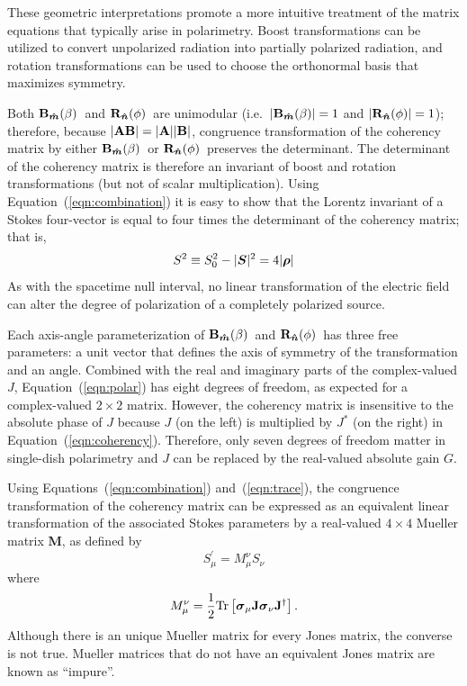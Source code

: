 \documentclass[twocolumn]{aastex6}
\newcommand{\mbf}[1]{\mbox{\boldmath $#1$}}
\newcommand{\mbfs}[1]{\mbox{\scriptsize\boldmath $#1$}}
\newcommand{\Eqn}[1]{Equation~(\ref{eqn:#1})}
\newcommand{\Eqns}[3]{Equations~(\ref{eqn:#1}) #2~(\ref{eqn:#3})}
\newcommand{\irow}{\mu} \newcommand{\icol}{\nu}
\newcommand{\trace}{{\rm Tr}}
\newcommand{\Rotation}{{\bf R}}
\newcommand{\Boost}{{\bf B}}
\newcommand{\vRotation}[1][n]{\ensuremath{\Rotation_{\mbfs{\hat #1}}}}
\newcommand{\vBoost}[1][m]{\ensuremath{\Boost_{\mbfs{\hat #1}}}}
\newcommand{\tr}[1]{\trace\ensuremath{ \left[ {#1} \right] }}
\newcommand{\rotat}{\ensuremath{\vRotation(\phi)}}
\newcommand{\boost}{\ensuremath{\vBoost(\beta)}}
\newcommand{\pauli}[1]{\ensuremath{\mbf{\sigma}_{#1}}}
\newcommand{\inv}[1]{\ensuremath{ {#1}^2 }}
\begin{document}
These geometric interpretations promote a more intuitive treatment of
the matrix equations that typically arise in polarimetry.
%
Boost transformations can be utilized to convert unpolarized radiation
into partially polarized radiation, and rotation transformations can
be used to choose the orthonormal basis that maximizes symmetry.

Both \boost\ and \rotat\ are unimodular (i.e.\ $|\boost|=1$ and
$|\rotat|=1$); therefore, because $|{\bf AB}|=|{\bf A}||{\bf B}|$,
congruence transformation of the coherency matrix by either \boost\ or
\rotat\ preserves the determinant.  The determinant of the coherency
matrix is therefore an invariant of boost and rotation transformations
(but not of scalar multiplication).  Using \Eqn{combination} it is
easy to show that the Lorentz invariant of a Stokes four-vector is
equal to four times the determinant of the coherency matrix; that is,
\begin{equation}
\inv{S} \equiv S_0^2 - |\mbf{S}|^2 = 4 |\mbf{\rho}|
\end{equation}
As with the spacetime null interval, no linear transformation of the
electric field can alter the degree of polarization of a completely
polarized source.

Each axis-angle parameterization of \boost\ and \rotat\ has three free
parameters: a unit vector that defines the axis of symmetry of the
transformation and an angle.  Combined with the real and imaginary
parts of the complex-valued $J$, \Eqn{polar} has eight degrees of
freedom, as expected for a complex-valued $2\times2$ matrix.  However,
the coherency matrix is insensitive to the absolute phase of $J$
because $J$ (on the left) is multiplied by $J^*$ (on the right) in
\Eqn{coherency}.  Therefore, only seven degrees of freedom matter
in single-dish polarimetry and $J$ can be replaced by the real-valued
absolute gain $G$.

Using \Eqns{combination}{and}{trace}, the congruence
transformation of the coherency matrix can be expressed as an
equivalent linear transformation of the associated Stokes parameters
by a real-valued $4\times4$ Mueller matrix {\bf M}, as defined by
%
\begin{equation}
 S_\irow^\prime = M_\irow^\icol S_\icol
\label{eqn:linear_to_Mueller}
\end{equation}
%
where
\begin{equation}
 M_\irow^\icol = \frac{1}{2} \tr{\pauli{\irow}{\bf J}\pauli{\icol}{\bf J}^\dagger}.
\end{equation}
%
Although there is an unique Mueller matrix for every Jones matrix, the
converse is not true.  Mueller matrices that do not have an equivalent Jones
matrix are known as ``impure''.
\end{document}

